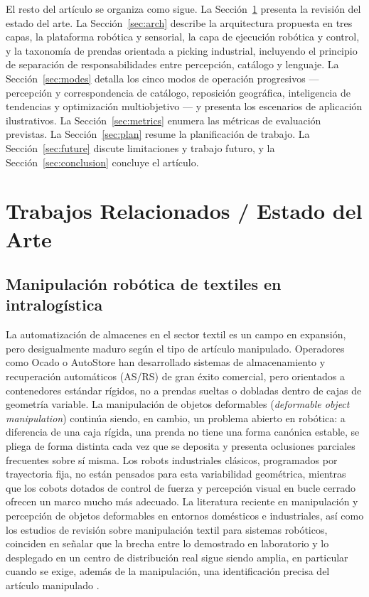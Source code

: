 \documentclass[conference]{IEEEtran}
\begin{document}
El resto del artículo se organiza como sigue. La Sección~\ref{sec:relwork}
presenta la revisión del estado del arte. La Sección~\ref{sec:arch} describe
la arquitectura propuesta en tres capas, la plataforma robótica y sensorial,
la capa de ejecución robótica y control, y la taxonomía de prendas orientada
a picking industrial, incluyendo el principio de separación de
responsabilidades entre percepción, catálogo y lenguaje. La
Sección~\ref{sec:modes} detalla los cinco modos de operación progresivos
--- percepción y correspondencia de catálogo, reposición geográfica,
inteligencia de tendencias y optimización multiobjetivo --- y presenta los
escenarios de aplicación ilustrativos. La Sección~\ref{sec:metrics} enumera
las métricas de evaluación previstas. La Sección~\ref{sec:plan} resume la
planificación de trabajo. La Sección~\ref{sec:future} discute limitaciones y
trabajo futuro, y la Sección~\ref{sec:conclusion} concluye el artículo.

\section{Trabajos Relacionados / Estado del Arte}
\label{sec:relwork}

\subsection{Manipulación robótica de textiles en intralogística}

La automatización de almacenes en el sector textil es un campo en expansión,
pero desigualmente maduro según el tipo de artículo manipulado. Operadores
como Ocado o AutoStore han desarrollado sistemas de almacenamiento y
recuperación automáticos (AS/RS) de gran éxito comercial, pero orientados a
contenedores estándar rígidos, no a prendas sueltas o dobladas dentro de
cajas de geometría variable. La manipulación de objetos deformables
(\emph{deformable object manipulation}) continúa siendo, en cambio, un
problema abierto en robótica: a diferencia de una caja rígida, una prenda no
tiene una forma canónica estable, se pliega de forma distinta cada vez que se
deposita y presenta oclusiones parciales frecuentes sobre sí misma. Los
robots industriales clásicos, programados por trayectoria fija, no están
pensados para esta variabilidad geométrica, mientras que los cobots dotados
de control de fuerza y percepción visual en bucle cerrado ofrecen un marco
mucho más adecuado. La literatura reciente en manipulación y percepción de
objetos deformables en entornos domésticos e industriales, así como los
estudios de revisión sobre manipulación textil para sistemas robóticos,
coinciden en señalar que la brecha entre lo demostrado en laboratorio y lo
desplegado en un centro de distribución real sigue siendo amplia, en
particular cuando se exige, además de la manipulación, una identificación
precisa del artículo manipulado \cite{sanchez2018deformable,
lui2023textilesurvey}.
\end{document}
